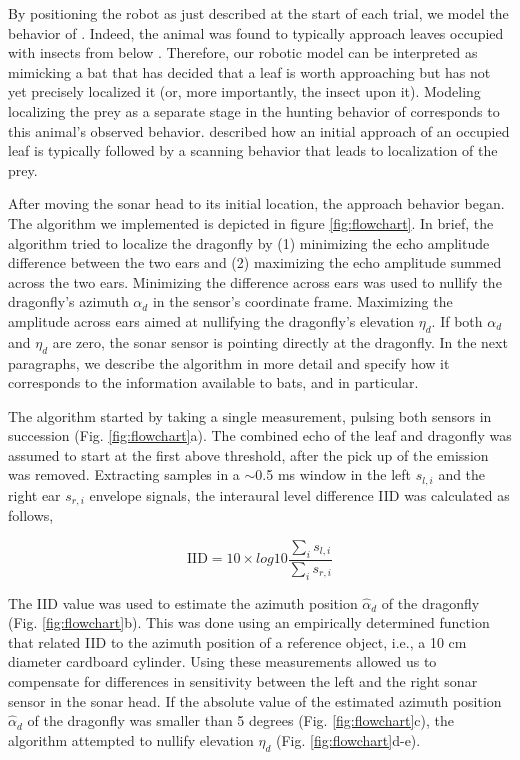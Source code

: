 \documentclass[letterpaper]{article}
\newcommand{\azimuth}{\alpha}
\newcommand{\elevation}{\eta}
\newcommand{\flowchart}[1]{(Fig. \ref{fig:flowchart}#1)}
\begin{document}
By positioning the robot as just described at the start of each trial, we model the behavior of . Indeed, the animal was found to typically approach leaves occupied with insects from below \citep{Geberl2013,Geipel2019}. Therefore, our robotic model can be interpreted as mimicking a bat that has decided that a leaf is worth approaching but has not yet precisely localized it (or, more importantly, the insect upon it). Modeling localizing the prey as a separate stage in the hunting behavior of  corresponds to this animal's observed behavior. \citet{Geipel2007} described how an initial approach of an occupied leaf is typically followed by a scanning behavior that leads to localization of the prey.

After moving the sonar head to its initial location, the approach behavior began. The algorithm we implemented is depicted in figure \ref{fig:flowchart}. In brief, the algorithm tried to localize the dragonfly by (1) minimizing the echo amplitude difference between the two ears and (2) maximizing the echo amplitude summed across the two ears. Minimizing the difference across ears was used to nullify the dragonfly's azimuth $\azimuth_d$ in the sensor's coordinate frame. Maximizing the amplitude across ears aimed at nullifying the dragonfly's elevation $\elevation_d$. If both  $\azimuth_d$ and $\elevation_d$ are zero, the sonar sensor is pointing directly at the dragonfly. In the next paragraphs, we describe the algorithm in more detail and specify how it corresponds to the information available to bats, and  in particular.

The algorithm started by taking a single measurement, pulsing both sensors in succession \flowchart{a}. The combined echo of the leaf and dragonfly was assumed to start at the first above threshold, after the pick up of the emission was removed. Extracting samples in a $\sim$0.5 ms window in the left $s_{l,i}$ and the right ear $s_{r,i}$ envelope signals, the interaural level difference IID was calculated as follows,

\begin{equation}
    \mbox{IID} = 10 \times log10 \frac{\sum_i s_{l,i}}{\sum_i s_{r,i}}
\end{equation}

The IID value was used to estimate the azimuth position $\hat{\azimuth}_d$ of the dragonfly \flowchart{b}. This was done using an empirically determined function that related IID to the azimuth position of a reference object, i.e., a 10 cm diameter cardboard cylinder. Using these measurements allowed us to compensate for differences in sensitivity between the left and the right sonar sensor in the sonar head. If the absolute value of the estimated azimuth position $\hat{\azimuth}_d$ of the dragonfly was smaller than 5 degrees \flowchart{c}, the algorithm attempted to nullify elevation $\elevation_d$ \flowchart{d-e}. 
\end{document}
